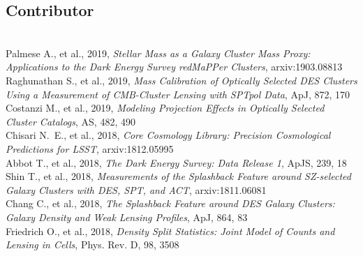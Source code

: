 \documentclass{res}
\begin{document}
\begin{resume}
\vspace{-12pt}
\section{Contributor}
\vspace{-8pt}
\hrulefill\\
Palmese A., et al., 2019, {\it Stellar Mass as a Galaxy Cluster Mass Proxy: Applications to the Dark Energy Survey redMaPPer Clusters}, arxiv:1903.08813\\
Raghunathan S., et al., 2019, {\it Mass Calibration of Optically Selected DES Clusters Using a Measurement of CMB-Cluster Lensing with SPTpol Data}, ApJ, 872, 170\\
Costanzi M., et al., 2019, {\it Modeling Projection Effects in Optically Selected Cluster Catalogs}, AS, 482, 490\\
Chisari N.~E., et al., 2018, {\it Core Cosmology Library: Precision Cosmological Predictions for LSST}, arxiv:1812.05995\\
Abbot T., et al., 2018, {\it The Dark Energy Survey: Data Release 1}, ApJS, 239, 18\\
Shin T., et al., 2018, {\it Measurements of the Splashback Feature around SZ-selected Galaxy Clusters with DES, SPT, and ACT}, arxiv:1811.06081\\
Chang C., et al., 2018, {\it The Splashback Feature around DES Galaxy Clusters: Galaxy Density and Weak Lensing Profiles}, ApJ, 864, 83\\
Friedrich O., et al., 2018, {\it Density Split Statistics: Joint Model of Counts and Lensing in Cells},  Phys. Rev. D, 98, 3508


\end{resume}
\end{document}
